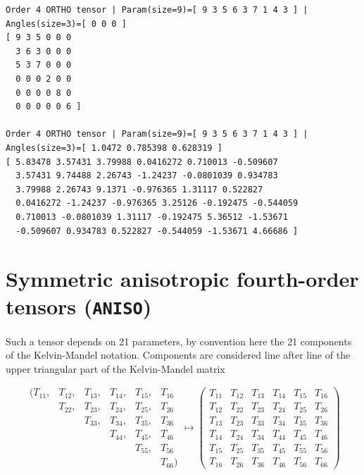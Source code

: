 \documentclass[
  letterpaper,
  DIV=11,
  numbers=noendperiod]{scrreprt}
\begin{document}
\begin{verbatim}
Order 4 ORTHO tensor | Param(size=9)=[ 9 3 5 6 3 7 1 4 3 ] | Angles(size=3)=[ 0 0 0 ]
[ 9 3 5 0 0 0 
  3 6 3 0 0 0 
  5 3 7 0 0 0 
  0 0 0 2 0 0 
  0 0 0 0 8 0 
  0 0 0 0 0 6 ]

Order 4 ORTHO tensor | Param(size=9)=[ 9 3 5 6 3 7 1 4 3 ] | Angles(size=3)=[ 1.0472 0.785398 0.628319 ]
[ 5.83478 3.57431 3.79988 0.0416272 0.710013 -0.509607 
  3.57431 9.74488 2.26743 -1.24237 -0.0801039 0.934783 
  3.79988 2.26743 9.1371 -0.976365 1.31117 0.522827 
  0.0416272 -1.24237 -0.976365 3.25126 -0.192475 -0.544059 
  0.710013 -0.0801039 1.31117 -0.192475 5.36512 -1.53671 
  -0.509607 0.934783 0.522827 -0.544059 -1.53671 4.66686 ]
\end{verbatim}

\section{\texorpdfstring{Symmetric anisotropic fourth-order tensors
(\texttt{ANISO})}{Symmetric anisotropic fourth-order tensors (ANISO)}}\label{symmetric-anisotropic-fourth-order-tensors-aniso}

Such a tensor depends on 21 parameters, by convention here the 21
components of the Kelvin-Mandel notation. Components are considered line
after line of the upper triangular part of the Kelvin-Mandel matrix

\[
\begin{array}{cccccc}
   (T_{11},&T_{12},&T_{13},&T_{14},&T_{15},&T_{16}\\
                          &T_{22},&T_{23},&T_{24},&T_{25},&T_{26}\\
                          &            &T_{33},&T_{34},&T_{35},&T_{36}\\
                          &            &             &T_{44},&T_{45},&T_{46}\\
                          &            &             &            &T_{55},&T_{56}\\
                          &            &             &            &            &T_{66})
   \end{array}
\mapsto
\left(
\begin{array}{cccccc}
     T_{11}&T_{12}&T_{13}&T_{14}&T_{15}&T_{16}\\
     T_{12}&T_{22}&T_{23}&T_{24}&T_{25}&T_{26}\\
     T_{13}&T_{23}&T_{33}&T_{34}&T_{35}&T_{36}\\
     T_{14}&T_{24}&T_{34}&T_{44}&T_{45}&T_{46}\\
     T_{15}&T_{25}&T_{35}&T_{45}&T_{55}&T_{56}\\
     T_{16}&T_{26}&T_{36}&T_{46}&T_{56}&T_{66}
\end{array}
\right)
\]
\end{document}
